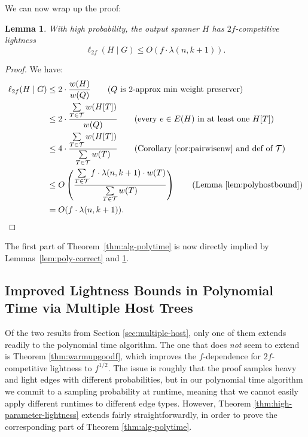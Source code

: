 \documentclass{article}
\theoremstyle{plain}
\newtheorem{lemma}[theorem]{Lemma}
\theoremstyle{definition}
\newcommand{\tee}{\mathcal{T}}
\begin{document}
We can now wrap up the proof:
\begin{lemma} \label{lem:poly-light}
With high probability, the output spanner $H$ has $2f$-competitive lightness
$$\ell_{2f}(H \mid G) \le O\left( f \cdot \lambda(n, k+1) \right).$$
\end{lemma}
\begin{proof}
We have:
\begin{align*}
\ell_{2f}(H \mid G) &\le 2 \cdot \frac{w(H)}{w(Q)} \tag{$Q$ is $2$-approx min weight preserver}\\
&\leq 2 \cdot \frac{\sum \limits_{T \in \tee} w(H[T])}{w(Q)} \tag{every $e \in E(H)$ in at least one $H[T]$} \\ 
&\leq 4 \cdot \frac{\sum \limits_{T \in \tee} w(H[T])}{\sum \limits_{T \in \tee} w(T)} \tag{Corollary~\ref{cor:pairwisenw} and def of $\tee$}\\
&\le  O\left( \frac{\sum \limits_{T \in \tee} f \cdot \lambda(n, k+1) \cdot w(T)}{\sum \limits_{T \in \tee} w(T)} \right) \tag{Lemma \ref{lem:polyhostbound}}\\
&= O(f \cdot \lambda(n, k+1)). \tag*{\qedhere}
\end{align*}
\end{proof}

The first part of Theorem~\ref{thm:alg-polytime} is now directly implied by Lemmas~\ref{lem:poly-correct} and \ref{lem:poly-light}.

\subsection{Improved Lightness Bounds in Polynomial Time via Multiple Host Trees}

Of the two results from Section \ref{sec:multiple-host}, only one of them extends readily to the polynomial time algorithm.
The one that does \emph{not} seem to extend is Theorem \ref{thm:warmupgoodf}, which improves the $f$-dependence for $2f$-competitive lightness to $f^{1/2}$.
The issue is roughly that the proof samples heavy and light edges with different probabilities, but in our polynomial time algorithm we commit to a sampling probability at runtime, meaning that we cannot easily apply different runtimes to different edge types.
However, Theorem \ref{thm:high-parameter-lightness} extends fairly straightforwardly, in order to prove the corresponding part of Theorem \ref{thm:alg-polytime}.
\end{document}
